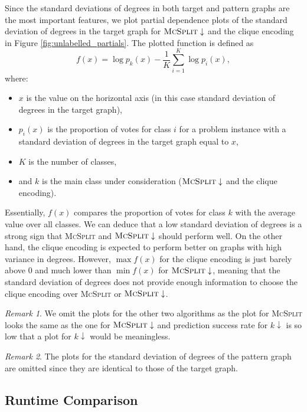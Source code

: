 \documentclass{l4proj}
\theoremstyle{definition}
\theoremstyle{remark}
\newtheorem{remark}{Remark}[chapter]
\begin{document}
Since the standard deviations of degrees in both target and pattern graphs are
the most important features, we plot partial dependence plots of the standard
deviation of degrees in the target graph for $\textsc{McSplit}\downarrow$ and
the clique encoding in Figure \ref{fig:unlabelled_partials}. The plotted
function \cite{forest} is defined as
\[ f(x) = \log{p_k(x)} - \frac{1}{K} \sum_{i=1}^K \log{p_i(x)}, \]
where:

\begin{itemize}
\item $x$ is the value on the horizontal axis (in this case standard deviation of
  degrees in the target graph),
\item $p_i(x)$ is the proportion of votes for class $i$ for a problem instance
  with a standard deviation of degrees in the target graph equal to $x$,
\item $K$ is the number of classes,
\item and $k$ is the main class under consideration
  ($\textsc{McSplit}\downarrow$ and the clique encoding).
\end{itemize}

Essentially, $f(x)$ compares the proportion of votes for class $k$ with the
average value over all classes. We can deduce that a low standard deviation of
degrees is a strong sign that \textsc{McSplit} and $\textsc{McSplit}\downarrow$
should perform well. On the other hand, the clique encoding is expected to
perform better on graphs with high variance in degrees. However, $\max f(x)$ for
the clique encoding is just barely above 0 and much lower than $\min f(x)$ for
$\textsc{McSplit}\downarrow$, meaning that the standard deviation of degrees
does not provide enough information to choose the clique encoding over
\textsc{McSplit} or $\textsc{McSplit}\downarrow$.

\begin{remark}
  We omit the plots for the other two algorithms as the plot for \textsc{McSplit}
  looks the same as the one for $\textsc{McSplit}\downarrow$ and prediction success
  rate for $k\downarrow$ is so low that a plot for $k\downarrow$ would be
  meaningless.
\end{remark}

\begin{remark}
  The plots for the standard deviation of degrees of the pattern graph are
  omitted since they are identical to those of the target graph.
\end{remark}

\subsection{Runtime Comparison}
\end{document}
